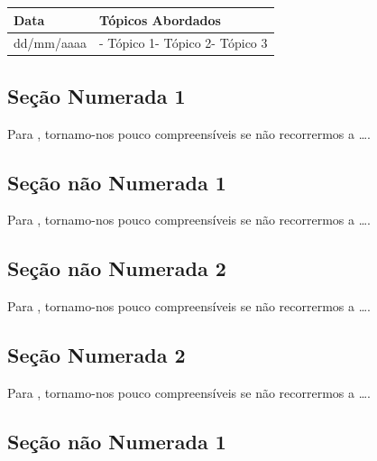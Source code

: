 \documentclass[
]{book}
\begin{document}
\begin{longtable}[]{@{}ll@{}}
\toprule()
Data & Tópicos Abordados \\
\midrule()
\endhead
dd/mm/aaaa & - Tópico 1- Tópico 2- Tópico 3 \\
\bottomrule()
\end{longtable}

\hypertarget{seuxe7uxe3o-numerada-1-15}{%
\subsection{Seção Numerada 1}\label{seuxe7uxe3o-numerada-1-15}}

Para \citet{BOCK2001}, tornamo-nos pouco compreensíveis se não recorrermos a \ldots.

\hypertarget{seuxe7uxe3o-nuxe3o-numerada-1-30}{%
\subsection*{Seção não Numerada 1}\label{seuxe7uxe3o-nuxe3o-numerada-1-30}}

Para \citet{BOCK2001}, tornamo-nos pouco compreensíveis se não recorrermos a \ldots.

\hypertarget{seuxe7uxe3o-nuxe3o-numerada-2-45}{%
\subsection*{Seção não Numerada 2}\label{seuxe7uxe3o-nuxe3o-numerada-2-45}}

Para \citet{BOCK2001}, tornamo-nos pouco compreensíveis se não recorrermos a \ldots.

\hypertarget{seuxe7uxe3o-numerada-2-15}{%
\subsection{Seção Numerada 2}\label{seuxe7uxe3o-numerada-2-15}}

Para \citet{BOCK2001}, tornamo-nos pouco compreensíveis se não recorrermos a \ldots.

\hypertarget{seuxe7uxe3o-nuxe3o-numerada-1-31}{%
\subsection*{Seção não Numerada 1}\label{seuxe7uxe3o-nuxe3o-numerada-1-31}}
\end{document}
